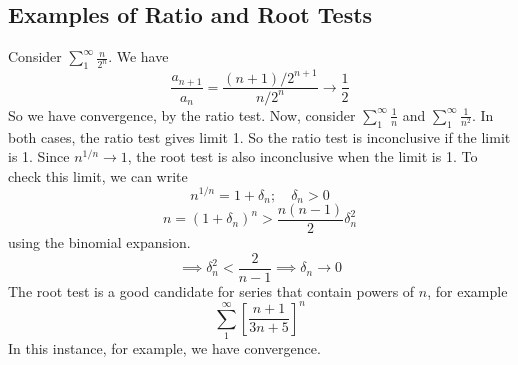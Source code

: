 \subsection{Examples of Ratio and Root Tests}
Consider \(\sum_1^\infty \frac{n}{2^n}\).
We have
\[
	\frac{a_{n+1}}{a_n} = \frac{(n+1)/2^{n+1}}{n/2^n} \to \frac{1}{2}
\]
So we have convergence, by the ratio test.
Now, consider \(\sum_1^\infty \frac{1}{n}\) and \(\sum_1^\infty \frac{1}{n^2}\).
In both cases, the ratio test gives limit 1.
So the ratio test is inconclusive if the limit is 1.
Since \(n^{1/n} \to 1\), the root test is also inconclusive when the limit is 1.
To check this limit, we can write
\[
	n^{1/n} = 1 + \delta_n;\quad \delta_n > 0
\]
\[
	n = (1 + \delta_n)^n > \frac{n(n-1)}{2}\delta_n^2
\]
using the binomial expansion.
\[
	\implies \delta_n^2 < \frac{2}{n-1} \implies \delta_n \to 0
\]
The root test is a good candidate for series that contain powers of \(n\), for example
\[
	\sum_1^\infty \left[ \frac{n+1}{3n+5} \right]^n
\]
In this instance, for example, we have convergence.

